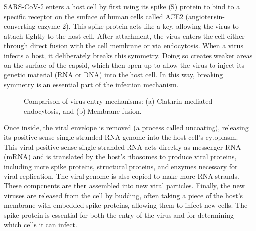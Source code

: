 \documentclass[12pt]{article}
\begin{document}
\begin{flushleft}
SARS-CoV-2 enters a host cell by first using its spike (S) protein to bind to a specific receptor on the surface of human cells called ACE2 (angiotensin-converting enzyme 2). This spike protein acts like a key, allowing the virus to attach tightly to the host cell. After attachment, the virus enters the cell either through direct fusion with the cell membrane or via endocytosis.\cite{Barrow2013}\cite{payne2022viruses} When a virus infects a host, it deliberately breaks this symmetry. Doing so creates weaker areas on the surface of the capsid, which then open up to allow the virus to inject its genetic material (RNA or DNA) into the host cell. In this way, breaking symmetry is an essential part of the infection mechanism.

\begin{figure}[htbp]
  \centering
  \begin{subfigure}[t]{0.45\textwidth}
    \centering
  \end{subfigure}
  \hfill
  \begin{subfigure}[t]{0.45\textwidth}
    \centering
  \end{subfigure}

  \caption{Comparison of virus entry mechanisms: (a) Clathrin-mediated endocytosis, and (b) Membrane fusion.}
  \label{fig:sidebyside}
\end{figure}


Once inside, the viral envelope is removed (a process called uncoating), releasing its positive-sense single-stranded RNA genome into the host cell’s cytoplasm. This viral positive-sense single-stranded RNA acts directly as messenger RNA (mRNA) and is translated by the host's ribosomes to produce viral proteins, including more spike proteins, structural proteins, and enzymes necessary for viral replication. The viral genome is also copied to make more RNA strands. These components are then assembled into new viral particles. Finally, the new viruses are released from the cell by budding, often taking a piece of the host’s membrane with embedded spike proteins, allowing them to infect new cells. The spike protein is essential for both the entry of the virus and for determining which cells it can infect.


\end{flushleft}
\end{document}
